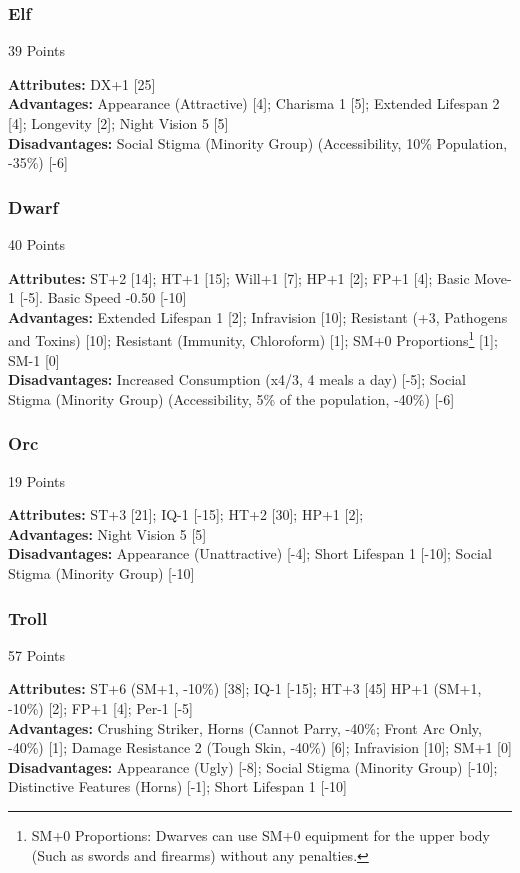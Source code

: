 \begin{multicols*}{3}
	\subsubsection*{Elf}
	\begin{flushright}
		39 Points
	\end{flushright}
	\textbf{Attributes:} 
	DX+1 [25]
	\\\textbf{Advantages:} 
	Appearance (Attractive) [4]; Charisma 1 [5]; Extended Lifespan 2 [4]; Longevity [2]; Night Vision 5 [5]
	\\\textbf{Disadvantages:} 
	Social Stigma (Minority Group) (Accessibility, 10\% Population, -35\%) [-6]
	
	\subsubsection*{Dwarf}
	\begin{flushright}
		40 Points
	\end{flushright}
	\textbf{Attributes:}
	ST+2 [14]; HT+1 [15]; Will+1 [7]; HP+1 [2]; FP+1 [4]; Basic Move-1 [-5]. Basic Speed -0.50 [-10]
	\\\textbf{Advantages:} 
	Extended Lifespan 1 [2]; Infravision [10]; Resistant (+3, Pathogens and Toxins) [10]; Resistant (Immunity, Chloroform) [1]; SM+0 Proportions\footnote{SM+0 Proportions: Dwarves can use SM+0 equipment for the upper body (Such as swords and firearms) without any penalties.} [1]; SM-1 [0]
	\\\textbf{Disadvantages:} 
	Increased Consumption (x4/3, 4 meals a day) [-5]; Social Stigma (Minority Group) (Accessibility, 5\% of the population, -40\%) [-6]
	
	\subsubsection*{Orc}
	\begin{flushright}
		19 Points
	\end{flushright}
	\textbf{Attributes:}
	ST+3 [21]; IQ-1 [-15]; HT+2 [30]; HP+1 [2];
	\\\textbf{Advantages:} 
	Night Vision 5 [5]
	\\\textbf{Disadvantages:} 
	Appearance (Unattractive) [-4]; Short Lifespan 1 [-10]; Social Stigma (Minority Group) [-10]
	
	\subsubsection*{Troll}
	\begin{flushright}
		57 Points
	\end{flushright}
	\textbf{Attributes:}
	ST+6 (SM+1, -10\%) [38]; IQ-1 [-15]; HT+3 [45] HP+1 (SM+1, -10\%) [2]; FP+1 [4]; Per-1 [-5]
	\\\textbf{Advantages:} 
	Crushing Striker, Horns (Cannot Parry, -40\%; Front Arc Only, -40\%) [1]; Damage Resistance 2 (Tough Skin, -40\%) [6]; Infravision [10]; SM+1 [0]
	\\\textbf{Disadvantages:} 
	Appearance (Ugly) [-8]; Social Stigma (Minority Group) [-10]; Distinctive Features (Horns) [-1]; Short Lifespan 1 [-10]
	

\end{multicols*}
